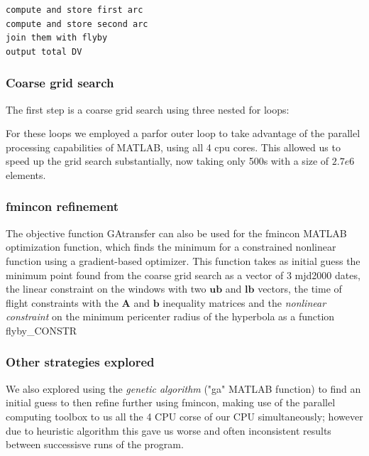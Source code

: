 \documentclass[11pt,a4paper]{report}
\renewcommand{\vec}[1]{\mathbf{#1}}
\begin{document}
\lstset{style=mystyle}
\begin{lstlisting}[frame=single,caption=GAtransfer objective function structure]  
compute and store first arc
compute and store second arc
join them with flyby
output total DV 
\end{lstlisting}


\subsubsection{Coarse grid search}
The first step is a coarse grid search using three nested for loops:\\

\lstset{style=mystyle}


For these loops we employed a parfor outer loop to take advantage of the parallel processing capabilities of MATLAB, using all 4 cpu cores. This allowed us to speed up the grid search substantially, now taking only 500s with a size of $2.7e6  $ elements.

\subsubsection{fmincon refinement}
The objective function GAtransfer can also be used for the fmincon MATLAB optimization function, which finds the minimum for a constrained nonlinear function using a gradient-based optimizer. This function takes as initial guess the minimum point found from the coarse grid search as a vector of 3 mjd2000 dates, the linear constraint on the windows with two $\vec{ub}$ and $\vec{lb}$ vectors, the time of flight constraints with the $\vec{A}$ and $\vec{b}$ inequality matrices and the \emph{nonlinear constraint} on the minimum pericenter radius of the hyperbola as a function flyby\_CONSTR\\
\subsubsection{Other strategies explored}

We also explored using the \emph{genetic algorithm} ("ga" MATLAB function) to find an initial guess to then refine further using fmincon, making use of the parallel computing toolbox to us all the 4 CPU corse of our CPU simultaneously; however due to heuristic algorithm this gave us worse and often inconsistent results between successisve runs of the program.
\end{document}
